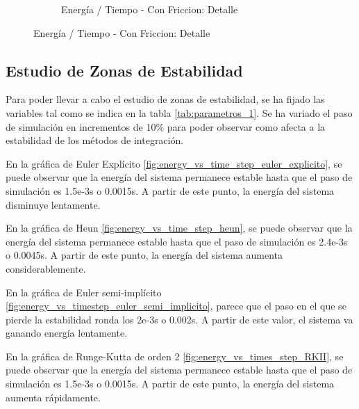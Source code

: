 \documentclass{article}
\begin{document}
\begin{figure}[H]
\begin{subfigure}{0.48\textwidth}
        \caption{Energía / Tiempo - Con Friccion: Detalle}
        \label{fig:energy_vs_time_euler_2B}
    \end{subfigure}

    \label{fig:combined_energy_vs_time_2}
\end{figure}

\subsection{Estudio de Zonas de Estabilidad}

Para poder llevar a cabo el estudio de zonas de estabilidad, se ha fijado las variables tal como se indica en la tabla \ref{tab:parametros_1}. Se ha variado el paso de simulación en incrementos de 10\% para poder observar como afecta a la estabilidad de los métodos de integración. 

En la gráfica de Euler Explícito \ref{fig:energy_vs_time_step_euler_explicito}, se puede observar que la energía del sistema permanece estable hasta que el paso de simulación es 1.5e-3s o 0.0015s. A partir de este punto, la energía del sistema disminuye lentamente. 

En la gráfica de Heun \ref{fig:energy_vs_time_step_heun}, se puede observar que la energía del sistema permanece estable hasta que el paso de simulación es 2.4e-3s o 0.0045s. A partir de este punto, la energía del sistema aumenta considerablemente.

En la gráfica de Euler semi-implícito \ref{fig:energy_vs_timestep_euler_semi_implicito}, parece que el paso en el que se pierde la estabilidad ronda los 2e-3s o 0.002s. A partir de este valor, el sistema va ganando energía lentamente.

En la gráfica de Runge-Kutta de orden 2 \ref{fig:energy_vs_times_step_RKII}, se puede observar que la energía del sistema permanece estable hasta que el paso de simulación es 1.5e-3s o 0.0015s. A partir de este punto, la energía del sistema aumenta rápidamente.
\end{document}
